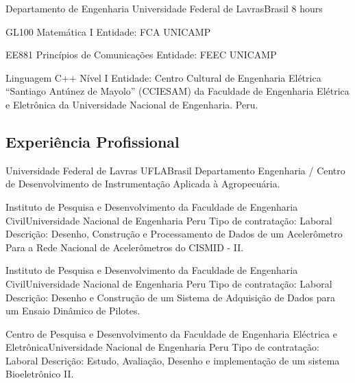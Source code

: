 \documentclass[11pt,a4paper,sans]{moderncv} %
\begin{document}
	      {Departamento de Engenharia}
	      {Universidade Federal de Lavras}{Brasil}
	      {8 hours}
	      
			  {GL100 }{Matemática I}{}
			  {Entidade: FCA UNICAMP }

			  {EE881 }{Princípios de Comunicações}{}
			  {Entidade: FEEC UNICAMP }

	      {Linguagem C++ }{ Nível I}{}
	      {Entidade: Centro Cultural de Engenharia Elétrica ``Santiago 
	      Antúnez de Mayolo'' (CCIESAM) da Faculdade de Engenharia Elétrica 
	      e Eletrônica da Universidade Nacional de Engenharia. Peru.}

\subsection{Experiência Profissional}


	      {Universidade Federal de Lavras}
	      {UFLA}{Brasil}
	      {Departamento Engenharia / Centro de Desenvolvimento de Instrumentação Aplicada à Agropecuária. }


		      {Instituto de Pesquisa e Desenvolvimento da Faculdade 
		      de Engenharia Civil}{Universidade Nacional de Engenharia }{Peru}
		      {Tipo de contratação: Laboral\newline{}
		      Descrição: Desenho, Construção e Processamento de Dados de um 
		      Acelerômetro Para a Rede Nacional de Acelerômetros do CISMID - II.}

		      {Instituto de Pesquisa e Desenvolvimento da Faculdade 
		      de Engenharia Civil}{Universidade Nacional de Engenharia }{Peru}
		      {Tipo de contratação: Laboral\newline{}
		      Descrição: Desenho e  Construção  de  um  Sistema  de  
		      Adquisição  de  Dados para  um  Ensaio  Dinâmico  de  Pilotes.}

		      {Centro de Pesquisa e Desenvolvimento da Faculdade de 
		      Engenharia Eléctrica e Eletrônica}{Universidade Nacional de Engenharia }{Peru}
		      {Tipo de contratação: Laboral\newline{}
		      Descrição: Estudo, Avaliação, Desenho e implementação de um sistema Bioeletrônico II.}
\end{document}
